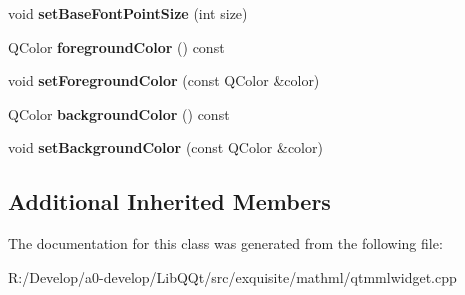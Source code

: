 \begin{DoxyCompactItemize}
\mbox{\label{class_mml_document_a74fed7e930bd37584df7945b6cff1238}} 
void {\bfseries set\+Base\+Font\+Point\+Size} (int size)
\item 
\mbox{\label{class_mml_document_a38d6a0323aadc78e5ce5b3fb6396afe6}} 
Q\+Color {\bfseries foreground\+Color} () const
\item 
\mbox{\label{class_mml_document_ab9a56858afc1bfb6f835d6c102c82cc1}} 
void {\bfseries set\+Foreground\+Color} (const Q\+Color \&color)
\item 
\mbox{\label{class_mml_document_ae755fc515b6d9486d6547ed91a5287bf}} 
Q\+Color {\bfseries background\+Color} () const
\item 
\mbox{\label{class_mml_document_a3024f987d7457d71d02c4c6c8dc94226}} 
void {\bfseries set\+Background\+Color} (const Q\+Color \&color)
\end{DoxyCompactItemize}
\subsection*{Additional Inherited Members}


The documentation for this class was generated from the following file\+:\begin{DoxyCompactItemize}
\item 
R\+:/\+Develop/a0-\/develop/\+Lib\+Q\+Qt/src/exquisite/mathml/qtmmlwidget.\+cpp\end{DoxyCompactItemize}
